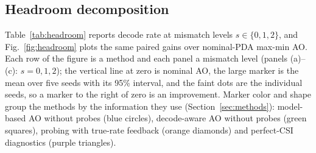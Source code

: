 \documentclass[journal]{IEEEtran}
\begin{document}
\subsection{Headroom decomposition}
\label{sec:headroom}
Table~\ref{tab:headroom} reports decode rate at mismatch levels $s\in\{0,1,2\}$, and Fig.~\ref{fig:headroom} plots the same paired gains over nominal-PDA max-min AO. Each row of the figure is a method and each panel a mismatch level (panels (a)--(c): $s=0,1,2$); the vertical line at zero is nominal AO, the large marker is the mean over five seeds with its 95\% interval, and the faint dots are the individual seeds, so a marker to the right of zero is an improvement. Marker color and shape group the methods by the information they use (Section~\ref{sec:methods}): model-based AO without probes (blue circles), decode-aware AO without probes (green squares), probing with true-rate feedback (orange diamonds) and perfect-CSI diagnostics (purple triangles).

\begin{table}[!tb]
\centering
\caption{Decode rate (\%) and paired difference to nominal-PDA AO (percentage points), mean $\pm$ 95\% CI over 5 seeds. Mismatch level $s$ scales the per-element deviation of the true hardware from the nominal curve.}
\label{tab:headroom}
\resizebox{\textwidth}{!}{}
\end{table}
\end{document}
